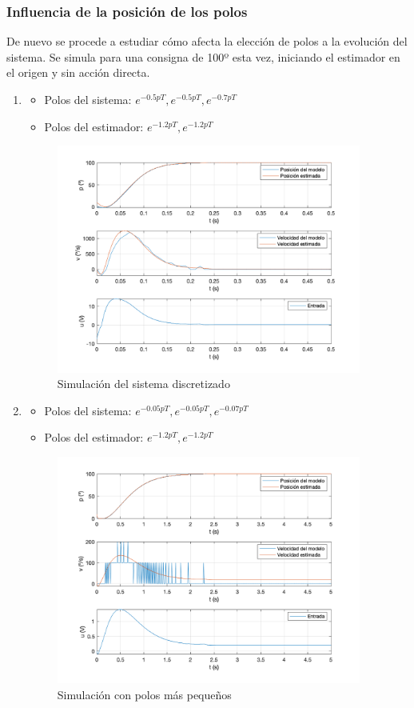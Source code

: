 \documentclass[a4paper, 12pt]{article}
\begin{document}
\subsubsection{Influencia de la posición de los polos}
De nuevo se procede a estudiar cómo afecta la elección de polos a la evolución del sistema. Se simula para una consigna de 100º esta vez, iniciando el estimador en el origen y sin acción directa. 
\begin{enumerate}
	\item 
	\begin{itemize}
		\item Polos del sistema: $e^{-0.5pT}, e^{-0.5pT}, e^{-0.7pT}$
		\item Polos del estimador: $e^{-1.2pT}, e^{-1.2pT}$
	\end{itemize}

\begin{figure}[H]
	\centering
	\includegraphics*[height = 7.5cm]{figs/p5/ki05}
	\caption{Simulación del sistema discretizado}
\end{figure}
\item 
	\begin{itemize}
		\item Polos del sistema: $e^{-0.05pT}, e^{-0.05pT}, e^{-0.07pT}$
		\item Polos del estimador: $e^{-1.2pT}, e^{-1.2pT}$
	\end{itemize}

\begin{figure}[H]
	\centering
	\includegraphics*[height = 7.5cm]{figs/p5/ki005}
	\caption{Simulación con polos más pequeños}
\end{figure}


\end{enumerate}
\end{document}
